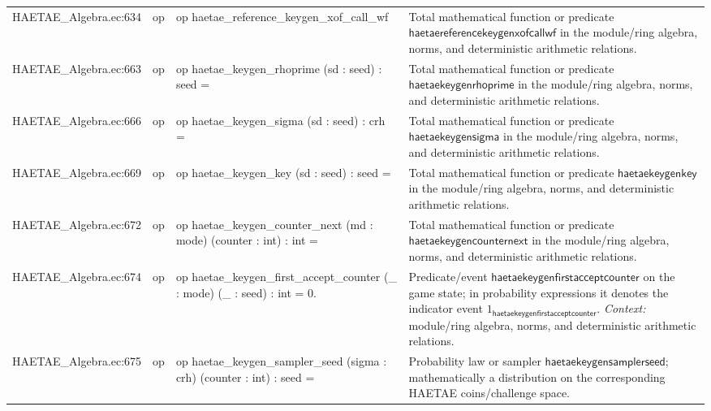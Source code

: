 \documentclass[10pt]{article}
\begin{document}
\begin{longtable}{L{0.11\textwidth}L{0.055\textwidth}L{0.385\textwidth}L{0.41\textwidth}}
HAETAE\_\allowbreak{}Algebra.\allowbreak{}ec:\allowbreak{}634 & op & {\ttfamily\scriptsize op haetae\_\allowbreak{}reference\_\allowbreak{}keygen\_\allowbreak{}xof\_\allowbreak{}call\_\allowbreak{}wf} & Total mathematical function or predicate $\mathsf{haetaereferencekeygenxofcallwf}$ in the module/ring algebra, norms, and deterministic arithmetic relations. \\
HAETAE\_\allowbreak{}Algebra.\allowbreak{}ec:\allowbreak{}663 & op & {\ttfamily\scriptsize op haetae\_\allowbreak{}keygen\_\allowbreak{}rhoprime (sd : seed) : seed =} & Total mathematical function or predicate $\mathsf{haetaekeygenrhoprime}$ in the module/ring algebra, norms, and deterministic arithmetic relations. \\
HAETAE\_\allowbreak{}Algebra.\allowbreak{}ec:\allowbreak{}666 & op & {\ttfamily\scriptsize op haetae\_\allowbreak{}keygen\_\allowbreak{}sigma (sd : seed) : crh =} & Total mathematical function or predicate $\mathsf{haetaekeygensigma}$ in the module/ring algebra, norms, and deterministic arithmetic relations. \\
HAETAE\_\allowbreak{}Algebra.\allowbreak{}ec:\allowbreak{}669 & op & {\ttfamily\scriptsize op haetae\_\allowbreak{}keygen\_\allowbreak{}key (sd : seed) : seed =} & Total mathematical function or predicate $\mathsf{haetaekeygenkey}$ in the module/ring algebra, norms, and deterministic arithmetic relations. \\
HAETAE\_\allowbreak{}Algebra.\allowbreak{}ec:\allowbreak{}672 & op & {\ttfamily\scriptsize op haetae\_\allowbreak{}keygen\_\allowbreak{}counter\_\allowbreak{}next (md : mode) (counter : int) : int =} & Total mathematical function or predicate $\mathsf{haetaekeygencounternext}$ in the module/ring algebra, norms, and deterministic arithmetic relations. \\
HAETAE\_\allowbreak{}Algebra.\allowbreak{}ec:\allowbreak{}674 & op & {\ttfamily\scriptsize op haetae\_\allowbreak{}keygen\_\allowbreak{}first\_\allowbreak{}accept\_\allowbreak{}counter (\_\allowbreak{} : mode) (\_\allowbreak{} : seed) : int = 0.} & Predicate/event $\mathsf{haetaekeygenfirstacceptcounter}$ on the game state; in probability expressions it denotes the indicator event $1_{\mathsf{haetaekeygenfirstacceptcounter}}$. \emph{Context:} module/ring algebra, norms, and deterministic arithmetic relations. \\
HAETAE\_\allowbreak{}Algebra.\allowbreak{}ec:\allowbreak{}675 & op & {\ttfamily\scriptsize op haetae\_\allowbreak{}keygen\_\allowbreak{}sampler\_\allowbreak{}seed (sigma : crh) (counter : int) : seed =} & Probability law or sampler $\mathsf{haetaekeygensamplerseed}$; mathematically a distribution on the corresponding HAETAE coins/challenge space. \\

\end{longtable}
\end{document}
